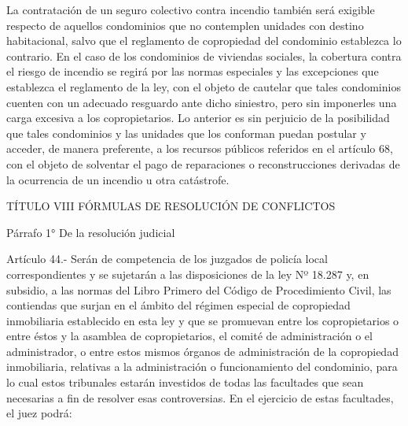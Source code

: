     La contratación de un seguro colectivo contra incendio también será exigible respecto de aquellos condominios que no contemplen unidades con destino habitacional, salvo que el reglamento de copropiedad del condominio establezca lo contrario.
    En el caso de los condominios de viviendas sociales, la cobertura contra el riesgo de incendio se regirá por las normas especiales y las excepciones que establezca el reglamento de la ley, con el objeto de cautelar que tales condominios cuenten con un adecuado resguardo ante dicho siniestro, pero sin imponerles una carga excesiva a los copropietarios. Lo anterior es sin perjuicio de la posibilidad que tales condominios y las unidades que los conforman puedan postular y acceder, de manera preferente, a los recursos públicos referidos en el artículo 68, con el objeto de solventar el pago de reparaciones o reconstrucciones derivadas de la ocurrencia de un incendio u otra catástrofe.

    TÍTULO VIII
    FÓRMULAS DE RESOLUCIÓN DE CONFLICTOS


    Párrafo 1°
    De la resolución judicial
   
    Artículo 44.- Serán de competencia de los juzgados de policía local correspondientes y se sujetarán a las disposiciones de la ley Nº 18.287 y, en subsidio, a las normas del Libro Primero del Código de Procedimiento Civil, las contiendas que surjan en el ámbito del régimen especial de copropiedad inmobiliaria establecido en esta ley y que se promuevan entre los copropietarios o entre éstos y la asamblea de copropietarios, el comité de administración o el administrador, o entre estos mismos órganos de administración de la copropiedad inmobiliaria, relativas a la administración o funcionamiento del condominio, para lo cual estos tribunales estarán investidos de todas las facultades que sean necesarias a fin de resolver esas controversias. En el ejercicio de estas facultades, el juez podrá:
     
